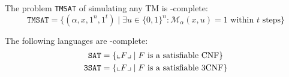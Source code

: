 \begin{theorem}
    The problem \texttt{TMSAT} of simulating any TM is \NP-complete:
    \[ \texttt{TMSAT} = \{ (\alpha, x, 1^n, 1^t) \mid \exists u \in \{0, 1\}^n: \mathcal{M}_\alpha(x, u) = 1 \text{ within $t$ steps} \} \]
\end{theorem}

\begin{theorem} 
    The following languages are \NP-complete:
    \[
        \begin{split}
            \texttt{SAT}  &= \{ {\llcorner{F}\lrcorner} \mid F \text{ is a satisfiable CNF} \} \\
            \texttt{3SAT} &= \{ {\llcorner{F}\lrcorner} \mid F \text{ is a satisfiable 3CNF} \} \\
        \end{split}  
    \]
\end{theorem}